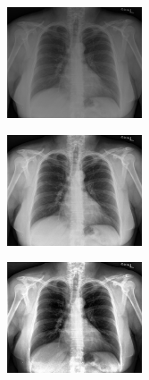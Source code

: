 \documentclass[spanish,twocolumn]{article}
\begin{document}
{%

\onecolumn
\noindent\begin{minipage}[b]{1.0\linewidth}
  \centering
   
   \begin{minipage}[t]{0.3\linewidth}  
   		\centering
        \includegraphics[width=4cm]{Figures/100_IM-0002-1001.png}
  	\end{minipage}
  \hspace{1pt}
   \begin{minipage}[t]{0.3\linewidth}  
   		\centering
        \includegraphics[width=4cm]{Figures/1182-100_IM-0002-1001.png}
  	\end{minipage}
  \hspace{1pt}
   \begin{minipage}[t]{0.3\linewidth}  
   		\centering
        \includegraphics[width=4cm]{Figures/738-100_IM-0002-1001.png}
  	\end{minipage}
  \vspace{0.5cm}
    \label{fig:resultado1}


\end{minipage}}
\end{document}

